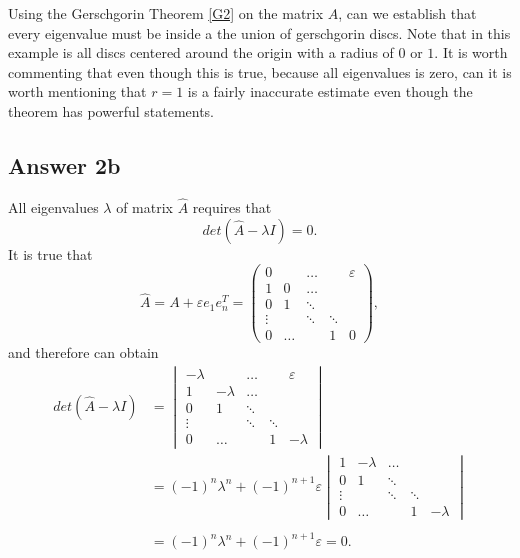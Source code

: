 \documentclass{article}
\theoremstyle{remark}
\begin{document}
Using the Gerschgorin Theorem \ref{G2} on the matrix $A$, can we establish that every eigenvalue must be inside a the union of gerschgorin discs. Note that in this example is all discs centered around the origin with a radius of $0$ or $1$. It is worth commenting that even though this is true, because all eigenvalues is zero, can it is worth mentioning that $r=1$ is a fairly inaccurate estimate even though the theorem has powerful statements.

    \subsection{Answer 2b}%
\label{sub:answer_b_}


    All eigenvalues $\lambda $ of matrix $\hat{A}$ requires that \[
    det\left( \hat{A} - \lambda I \right) = 0.
    \]  
    It is true that
    \[
    \hat{A} = A + \varepsilon e_{1}e_{n}^{T} = \begin{pmatrix}
    0    &   &  \ldots           &    &  \varepsilon  \\
    1  & 0  &  \ldots \\
    0  &  1  & \ddots  \\
    \vdots   &   &  \ddots   &  \ddots   & \\
     0  &  \ldots  &   &  1  & 0
    \end{pmatrix}, 
    \] 
    and therefore can obtain
     \[
      \begin{split}
    det \left(  \hat{A} - \lambda I \right)  & = \begin{vmatrix}
    -\lambda     &   &  \ldots           &    &  \varepsilon  \\
    1  & -\lambda   &  \ldots \\
    0  &  1  & \ddots  \\
    \vdots   &   &  \ddots   &  \ddots   & \\
     0  &  \ldots  &   &  1  & -\lambda 
    \end{vmatrix}  \\
    &=  \left( -1 \right)^{n} \lambda ^{n}  + \left( -1 \right)^{n+1}\varepsilon 
     \begin{vmatrix}
    1  & -\lambda   &  \ldots \\
    0  &  1  & \ddots  \\
    \vdots   &   &  \ddots   &  \ddots   & \\
     0  &  \ldots  &   &  1  & -\lambda 
    \end{vmatrix}  \\
     \\
     &=  \left( -1 \right)^{n} \lambda ^{n} + \left( -1 \right)^{n+1}\varepsilon  = 0 .  \\
      \end{split} 
    \] 
\end{document}
